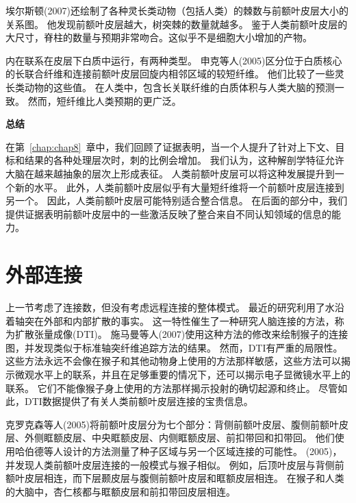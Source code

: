 埃尔斯顿(2007)还绘制了各种灵长类动物（包括人类）的棘数与前额叶皮层大小的关系图。
他发现前额叶皮层越大，树突棘的数量就越多。
鉴于人类前额叶皮层的大尺寸，脊柱的数量与预期非常吻合。这似乎不是细胞大小增加的产物。
\par


内在联系在皮层下白质中运行，有两种类型。
申克等人(2005)区分位于白质核心的长联合纤维和连接前额叶皮层回旋内相邻区域的较短纤维。
他们比较了一些灵长类动物的这些值。
在人类中，包含长关联纤维的白质体积与人类大脑的预测一致。
然而，短纤维比人类预期的更广泛。
\par



\textbf{总结}
\par

在第~\ref{chap:chap8}~章中，我们回顾了证据表明，当一个人提升了针对上下文、目标和结果的各种处理层次时，刺的比例会增加。
我们认为，这种解剖学特征允许大脑在越来越抽象的层次上形成表征。
人类前额叶皮层可以将这种发展提升到一个新的水平。
此外，人类前额叶皮层似乎有大量短纤维将一个前额叶皮层连接到另一个。
因此，人类前额叶皮层可能特别适合整合信息。
在后面的部分中，我们提供证据表明前额叶皮层中的一些激活反映了整合来自不同认知领域的信息的能力。



\section{外部连接}

上一节考虑了连接数，但没有考虑远程连接的整体模式。
最近的研究利用了水沿着轴突在外部和内部扩散的事实。
这一特性催生了一种研究人脑连接的方法，称为扩散张量成像(DTI)。
施马曼等人(2007)使用这种方法的修改来绘制猴子的连接图，并发现类似于标准轴突纤维追踪方法的结果。
然而，DTI有严重的局限性。
这些方法永远不会像在猴子和其他动物身上使用的方法那样敏感，这些方法可以揭示微观水平上的联系，并且在足够重要的情况下，还可以揭示电子显微镜水平上的联系。
它们不能像猴子身上使用的方法那样揭示投射的确切起源和终止。
尽管如此，DTI数据提供了有关人类前额叶皮层连接的宝贵信息。
\par


克罗克森等人(2005)将前额叶皮层分为七个部分：背侧前额叶皮层、腹侧前额叶皮层、外侧眶额皮层、中央眶额皮层、内侧眶额皮层、前扣带回和扣带回。
他们使用哈伯德等人设计的方法测量了种子区域与另一个区域连接的可能性。
(2005)，并发现人类前额叶皮层连接的一般模式与猴子相似。
例如，后顶叶皮层与背侧前额叶皮层相连，而下层颞皮层与腹侧前额叶皮层和眶额皮层相连。
在猴子和人类的大脑中，杏仁核都与眶额皮层和前扣带回皮层相连。
\par


